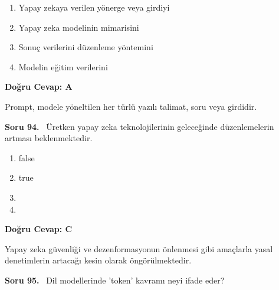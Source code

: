 \documentclass[11pt,a4paper,openany]{book}
\begin{document}
\begin{enumerate}[label=\Alph*), leftmargin=25pt, topsep=4pt, itemsep=2pt]
        \item Yapay zekaya verilen yönerge veya girdiyi
        \item Yapay zeka modelinin mimarisini
        \item Sonuç verilerini düzenleme yöntemini
        \item Modelin eğitim verilerini
\end{enumerate}

\vspace{4pt}
\begin{tcolorbox}[title=Cevap ve Açıklama, colback=gray!3!white, colframe=primarycolor!90!black, arc=2mm, fonttitle=\bfseries\sffamily, top=6pt, bottom=6pt]
    \textbf{Doğru Cevap: A}

    \vspace{2pt}
    Prompt, modele yöneltilen her türlü yazılı talimat, soru veya girdidir.
\end{tcolorbox}
\vspace{10pt}
\needspace{5cm}
\vspace{8pt}
\noindent\textbf{\large\sffamily Soru 94.} \ Üretken yapay zeka teknolojilerinin geleceğinde düzenlemelerin artması beklenmektedir.

\begin{enumerate}[label=\Alph*), leftmargin=25pt, topsep=4pt, itemsep=2pt]
        \item false
        \item true
        \item 
        \item 
\end{enumerate}

\vspace{4pt}
\begin{tcolorbox}[title=Cevap ve Açıklama, colback=gray!3!white, colframe=primarycolor!90!black, arc=2mm, fonttitle=\bfseries\sffamily, top=6pt, bottom=6pt]
    \textbf{Doğru Cevap: C}

    \vspace{2pt}
    Yapay zeka güvenliği ve dezenformasyonun önlenmesi gibi amaçlarla yasal denetimlerin artacağı kesin olarak öngörülmektedir.
\end{tcolorbox}
\vspace{10pt}
\needspace{5cm}
\vspace{8pt}
\noindent\textbf{\large\sffamily Soru 95.} \ Dil modellerinde 'token' kavramı neyi ifade eder?
\end{document}
